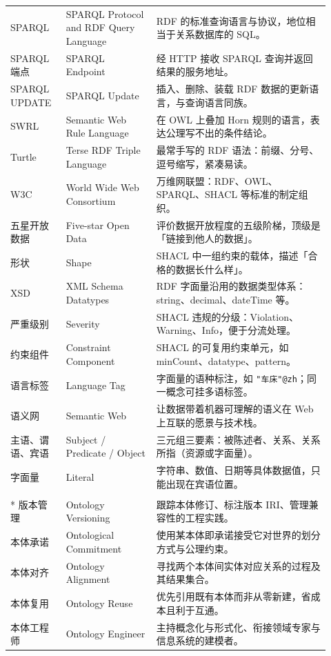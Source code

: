 \begin{longtable}{@{}p{0.16\linewidth}p{0.26\linewidth}p{0.5\linewidth}@{}}
SPARQL & SPARQL Protocol and RDF Query Language & RDF 的标准查询语言与协议，地位相当于关系数据库的 SQL。 \\
SPARQL 端点 & SPARQL Endpoint & 经 HTTP 接收 SPARQL 查询并返回结果的服务地址。 \\
SPARQL UPDATE & SPARQL Update & 插入、删除、装载 RDF 数据的更新语言，与查询语言同族。 \\
SWRL & Semantic Web Rule Language & 在 OWL 上叠加 Horn 规则的语言，表达公理写不出的条件结论。 \\
Turtle & Terse RDF Triple Language & 最常手写的 RDF 语法：前缀、分号、逗号缩写，紧凑易读。 \\
W3C & World Wide Web Consortium & 万维网联盟：RDF、OWL、SPARQL、SHACL 等标准的制定组织。 \\
五星开放数据 & Five-star Open Data & 评价数据开放程度的五级阶梯，顶级是「链接到他人的数据」。 \\
形状 & Shape & SHACL 中一组约束的载体，描述「合格的数据长什么样」。 \\
XSD & XML Schema Datatypes & RDF 字面量沿用的数据类型体系：string、decimal、dateTime 等。 \\
严重级别 & Severity & SHACL 违规的分级：Violation、Warning、Info，便于分流处理。 \\
约束组件 & Constraint Component & SHACL 的可复用约束单元，如 minCount、datatype、pattern。 \\
语言标签 & Language Tag & 字面量的语种标注，如 \texttt{"车床"@zh}；同一概念可挂多语标签。 \\
语义网 & Semantic Web & 让数据带着机器可理解的语义在 Web 上互联的愿景与技术栈。 \\
主语、谓语、宾语 & Subject / Predicate / Object & 三元组三要素：被陈述者、关系、关系所指（资源或字面量）。 \\
字面量 & Literal & 字符串、数值、日期等具体数据值，只能出现在宾语位置。 \\
\addlinespace[10pt]
\multicolumn{3}{@{}l}{\textbf{——方法论——}} \\*
\addlinespace[3pt]
版本管理 & Ontology Versioning & 跟踪本体修订、标注版本 IRI、管理兼容性的工程实践。 \\
本体承诺 & Ontological Commitment & 使用某本体即承诺接受它对世界的划分方式与公理约束。 \\
本体对齐 & Ontology Alignment & 寻找两个本体间实体对应关系的过程及其结果集合。 \\
本体复用 & Ontology Reuse & 优先引用既有本体而非从零新建，省成本且利于互通。 \\
本体工程师 & Ontology Engineer & 主持概念化与形式化、衔接领域专家与信息系统的建模者。 \\

\end{longtable}
